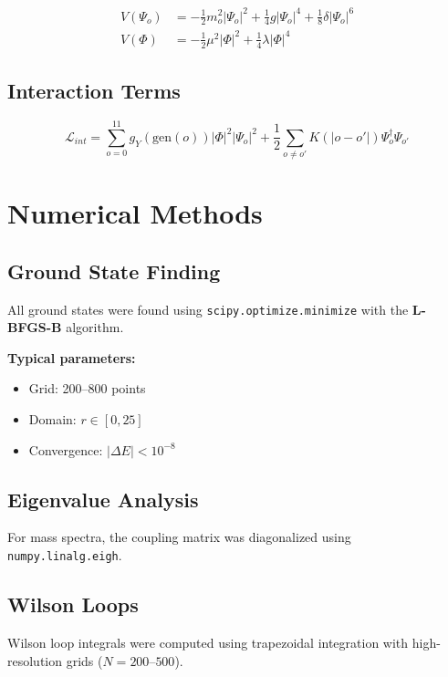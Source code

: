 \documentclass[11pt,a4paper]{book}
\theoremstyle{remark}
\begin{document}
\begin{align}
V(\Psi_o) &= -\frac{1}{2} m_o^2 |\Psi_o|^2 + \frac{1}{4} g |\Psi_o|^4 + \frac{1}{8} \delta |\Psi_o|^6 \\
V(\Phi) &= -\frac{1}{2} \mu^2 |\Phi|^2 + \frac{1}{4} \lambda |\Phi|^4
\end{align}

\subsection{Interaction Terms}

\begin{equation}
\mathcal{L}_{int} = \sum_{o=0}^{11} g_Y(\text{gen}(o)) |\Phi|^2 |\Psi_o|^2 + \frac{1}{2} \sum_{o \neq o'} K(|o-o'|) \Psi_o^\dagger \Psi_{o'}
\end{equation}

\section{Numerical Methods}

\subsection{Ground State Finding}

All ground states were found using \texttt{scipy.optimize.minimize} with the \textbf{L-BFGS-B} algorithm.

\textbf{Typical parameters:}
\begin{itemize}
    \item Grid: 200--800 points
    \item Domain: $r \in [0, 25]$
    \item Convergence: $|\Delta E| < 10^{-8}$
\end{itemize}

\subsection{Eigenvalue Analysis}

For mass spectra, the coupling matrix was diagonalized using \texttt{numpy.linalg.eigh}.

\subsection{Wilson Loops}

Wilson loop integrals were computed using trapezoidal integration with high-resolution grids ($N = 200$--$500$).
\end{document}
